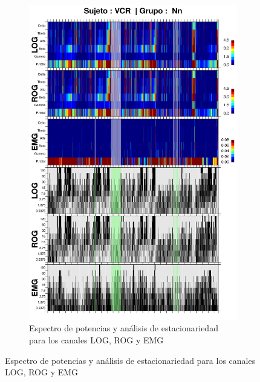 \begin{figure}
\ContinuedFloat
\begin{subfigure}{\linewidth}
\centering
\includegraphics[width=0.9\linewidth]
{./img_resultados/VCNNS1_combinado_.png} 
\caption{Espectro de potencias y análisis de estacionariedad para los canales LOG, ROG y EMG}
\end{subfigure}
\end{figure}

